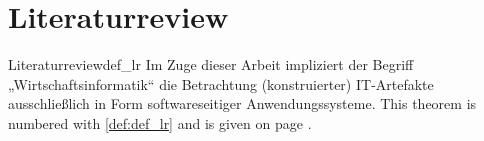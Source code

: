 \section{Literaturreview}

\begin{mydef}{Literaturreview}{def_lr}
  Im Zuge dieser Arbeit impliziert der Begriff „Wirtschaftsinformatik“ die Betrachtung (konstruierter) IT-Artefakte ausschließlich in Form softwareseitiger Anwendungssysteme.
  This theorem is numbered with  \ref{def:def_lr} and is given on page \pageref{def:def_lr}.
\end{mydef}